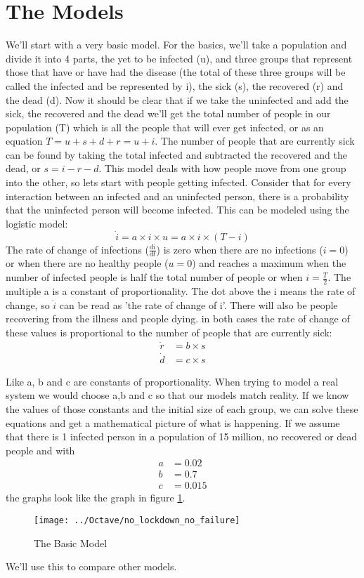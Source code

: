 \section{The Models}

We'll start with a very basic model. For the basics, we'll take a population and divide it into 4 parts, the yet to be infected (u), and three groups that represent those that have or have had the disease (the total of these three groups will be called the infected and be represented by i), the sick (s), the recovered (r) and the dead (d). Now it should be clear that if we take the uninfected and add the sick, the recovered and the dead we'll get the total number of people in our population (T) which is all the people that will ever get infected, or as an equation \(T=u+s+d+r=u+i\). The number of people that are currently sick can be found by taking the total infected and subtracted the recovered and the dead, or \(s = i-r-d\). This model deals with how people move from one group into the other, so lets start with people getting infected. Consider that for every interaction between an infected and an uninfected person, there is a probability that the uninfected person will become infected. This can be modeled using the logistic model: 
 \[
\dot{i}=a\times i\times u=a\times i\times (T-i)
\]
The rate of change of infections (\(\frac{di}{dt}\)) is zero when there are no infections (\(i=0\)) or when there are no healthy people (\(u=0\)) and reaches a maximum when the number of infected people is half the total number of people or when \(i = \frac{T}{2}\). The multiple a is a constant of proportionality. The dot above the i means the rate of change, so \(\dot{i}\) can be read as 'the rate of change of i'. There will also be people recovering from the illness and people dying. in both cases the rate of change of these values is proportional to the number of people that are currently sick:
\[
\begin{split}
\dot{r} &= b\times s\\
\dot{d} &= c\times s
\end{split}
\]

Like a, b and c are constants of proportionality. When trying to model a real system we would choose a,b and c so that our models match reality. If we know the values of those constants and the initial size of each group, we can solve these equations and get a mathematical picture of what is happening. If we assume that there is 1 infected person in a population of 15 million, no recovered or dead people and with \[
\begin{split}
a &= 0.02\\
b &= 0.7\\
c &= 0.015
\end{split}
\]
the graphs look like the graph in figure \ref{fig:nolockdownnofailure}.
\begin{figure}[H]
	\centering
	\texttt{[image: ../Octave/no\_lockdown\_no\_failure]}
	\caption[The Basic Model]{The Basic Model}
	\label{fig:nolockdownnofailure}
\end{figure}
We'll use this to compare other models.

